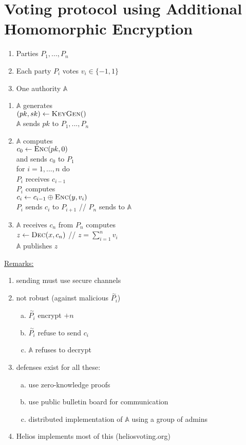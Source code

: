 \documentclass{report}
\begin{document}
\section{Voting protocol using Additional Homomorphic Encryption}
\begin{adjustwidth}{2em}{2em}
	\begin{enumerate}
		\item Parties $P_1, ..., P_n$
		\item Each party $P_i$ votes $v_i \in \{ -1, 1 \}$
		\item One authority $\mathbb{A}$
	\end{enumerate}
	\begin{enumerate}[1.]
		\item $\mathbb{A}$ generates \\
		\indent $(pk, sk) \leftarrow \textsc{KeyGen}()$ \\
		$\mathbb{A}$ sends $pk$ to $P_1, ..., P_n$
		\item $\mathbb{A}$ computes \\
		\indent $c_0 \leftarrow \textsc{Enc}(pk, 0)$ \\
		and sends $c_0$ to $P_1$ \\
		for $i = 1,...,n$ do \\
		\indent $P_i$ receives $c_{i-1}$ \\
		\indent $P_i$ computes \\
		\indent \indent $c_i \leftarrow c_{i-1} \oplus \textsc{Enc}(y, v_i)$ \\
		\indent $P_i$ sends $c_i$ to $P_{i+1}$ // $P_n$ sends to $\mathbb{A}$
		\item $\mathbb{A}$ receives $c_n$ from $P_n$ computes \\
		\indent $z \leftarrow \textsc{Dec}(x, c_n)$ // $z = \sum_{i=1}^n v_i$ \\
		$\mathbb{A}$ publishes $z$
	\end{enumerate}
	\underline{Remarks:}
	\begin{enumerate}[-]
		\item sending must use secure channels
		\item not robust (against malicious $\stackrel{\sim}{P_i}$)
		\begin{enumerate}[a)]
			\item $\stackrel{\sim}{P_i}$ encrypt $+n$
			\item $\stackrel{\sim}{P_i}$ refuse to send $c_i$
			\item $\mathbb{A}$ refuses to decrypt
		\end{enumerate}
		\item defenses exist for all these:
		\begin{enumerate}[a)]
			\item use zero-knowledge proofs
			\item use public bulletin board for communication
			\item distributed implementation of $\mathbb{A}$ using a group of admins
		\end{enumerate}
		\item Helios implements most of this (heliosvoting.org)
	\end{enumerate}
\end{adjustwidth}
\end{document}
